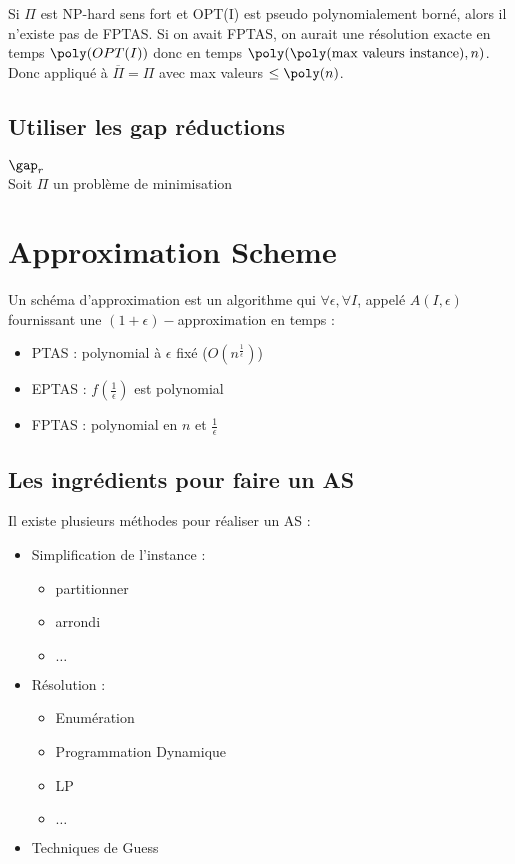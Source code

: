 \documentclass[a4paper, 11pt]{thesis}
\begin{document}
Si $\Pi$ est NP-hard sens fort et OPT(I) est pseudo polynomialement borné, alors il n'existe pas de
FPTAS. Si on avait FPTAS, on aurait une résolution exacte en temps $\poly(OPT(I))$ donc en temps
$\poly(\poly(\mbox{max valeurs instance}), n)$. Donc appliqué à $\overline{\Pi} = \Pi$ avec max valeurs
$\leq \poly(n)$.

\section{Utiliser les gap réductions}

\begin{df}
    $\gap_r$\\
    Soit $\Pi$ un problème de minimisation
\end{df}

\chapter{Approximation Scheme}

\begin{df}
    Un schéma d'approximation est un algorithme qui $\forall \epsilon, \forall I$, appelé $A(I,
    \epsilon)$ fournissant une $(1 + \epsilon)-$approximation en temps :\begin{itemize}
        \item PTAS : polynomial à $\epsilon$ fixé ($O(n^{\frac{1}{\epsilon}})$)
        \item EPTAS : $f(\frac{1}{\epsilon})$ est polynomial
        \item FPTAS : polynomial en $n$ et $\frac{1}{\epsilon}$
    \end{itemize}
\end{df}

\section{Les ingrédients pour faire un AS}

Il existe plusieurs méthodes pour réaliser un AS :
\begin{itemize}
    \item Simplification de l'instance : \begin{itemize}
            \item partitionner
            \item arrondi
            \item $\dots$
        \end{itemize}
    \item Résolution : \begin{itemize}
            \item Enumération
            \item Programmation Dynamique
            \item LP
            \item $\dots$
        \end{itemize}
    \item Techniques de Guess
\end{itemize}
\end{document}
